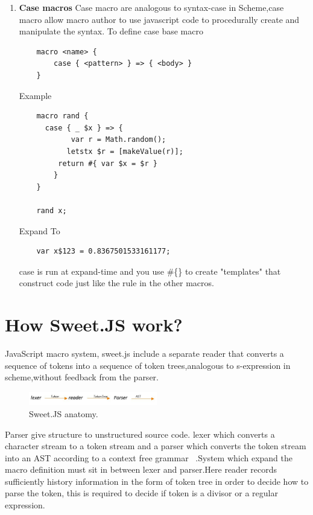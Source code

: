\begin{enumerate}
\item {\bf Case macros }
Case macro are analogous to syntax-case in Scheme,case macro allow macro author to use javascript code to procedurally create and manipulate the syntax.
To define case base macro
\begin{lstlisting}
	macro <name> {
  		case { <pattern> } => { <body> }
	}
\end{lstlisting}
Example
\begin{lstlisting}
	macro rand {
  	  case { _ $x } => {
    	    var r = Math.random();
     	   letstx $r = [makeValue(r)];
      	 return #{ var $x = $r }
   		}
	}

	rand x;
\end{lstlisting}

Expand To

\begin{lstlisting}
	var x$123 = 0.8367501533161177;
\end{lstlisting}
case is run at expand-time and you use \#\{\} to create "templates" that construct code just like the rule in the other macros.

\end{enumerate}

\section{How Sweet.JS work?}

JavaScript macro system, sweet.js include a separate reader that converts a sequence of tokens into a sequence of token trees,analogous to s-expression in scheme,without feedback from the parser.

\begin{figure}[htb]
\centering
\includegraphics[width=0.5\textwidth]{images/Tokenizer.jpg}
\caption{Sweet.JS anatomy.} 
\label{fig:Tokenizer}
\end{figure}

Parser give structure to unstructured source code. lexer which converts a character stream to a token stream and a parser which converts the token stream into an AST according to a context free grammar ~\cite{bib2}.System which expand the macro definition must sit in between lexer and parser.Here reader records sufficiently history information in the form of token tree in order to decide how to parse the token, this is required to decide if token is a divisor or a regular expression.

